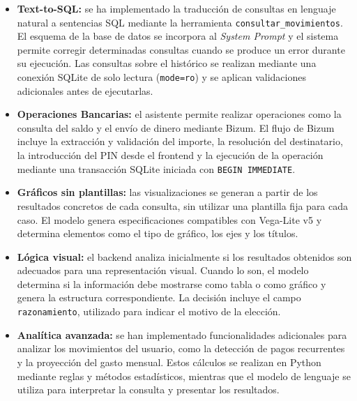 \begin{itemize}

    \item \textbf{Text-to-SQL:} se ha implementado la traducción de
    consultas en lenguaje natural a sentencias SQL mediante la herramienta
    \texttt{consultar\_movimientos}. El esquema de la base de datos se incorpora
    al \textit{System Prompt} y el sistema permite corregir determinadas
    consultas cuando se produce un error durante su ejecución. Las consultas
    sobre el histórico se realizan mediante una conexión SQLite de solo lectura
    (\texttt{mode=ro}) y se aplican validaciones adicionales antes de ejecutarlas.

    \item \textbf{Operaciones Bancarias:} el asistente permite
    realizar operaciones como la consulta del saldo y el envío de dinero
    mediante Bizum. El flujo de Bizum incluye la extracción y validación del
    importe, la resolución del destinatario, la introducción del PIN desde el
    frontend y la ejecución de la operación mediante una transacción SQLite
    iniciada con \texttt{BEGIN IMMEDIATE}.

    \item \textbf{Gráficos sin plantillas:} las visualizaciones se
    generan a partir de los resultados concretos de cada consulta, sin utilizar
    una plantilla fija para cada caso. El modelo genera especificaciones
    compatibles con Vega-Lite v5 y determina elementos como el tipo de gráfico,
    los ejes y los títulos.

    \item \textbf{Lógica visual:} el backend analiza inicialmente
    si los resultados obtenidos son adecuados para una representación visual.
    Cuando lo son, el modelo determina si la información debe mostrarse como
    tabla o como gráfico y genera la estructura correspondiente. La decisión
    incluye el campo \texttt{razonamiento}, utilizado para indicar el motivo de
    la elección.

    \item \textbf{Analítica avanzada:} se han implementado
    funcionalidades adicionales para analizar los movimientos del usuario,
    como la detección de pagos recurrentes y la proyección del gasto mensual.
    Estos cálculos se realizan en Python mediante reglas y métodos estadísticos,
    mientras que el modelo de lenguaje se utiliza para interpretar la consulta
    y presentar los resultados.

\end{itemize}